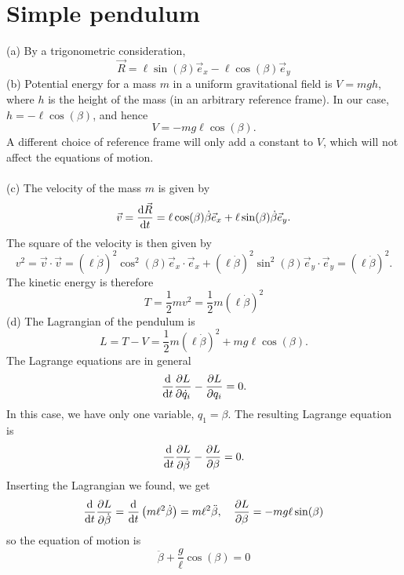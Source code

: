 \documentclass{article}
\begin{document}
    \section{Simple pendulum}
        (a) By a trigonometric consideration,
        \begin{equation*}
            \vec R = \ell \sin(\beta) \vec e_x - \ell \cos(\beta) \vec e_y
        \end{equation*}
        (b) Potential energy for a mass $m$ in a uniform gravitational field is $V = mgh$, where $h$ is the height of the mass (in an arbitrary reference frame). In our case, $h = - \ell \cos(\beta)$, and hence
        \begin{equation*}
            V = - m g \ell \cos(\beta).
        \end{equation*}
        A different choice of reference frame will only add a constant to $V$, which will not affect the equations of motion. \\ \\
        (c) The velocity of the mass $m$ is given by
        \begin{equation*}
            \vec v = \dv{\vec R}{t} = \ell \cos(\beta) \dot \beta \vec e_x + \ell \sin(\beta) \dot \beta \vec e_y.
        \end{equation*}
        The square of the velocity is then given by
        \begin{equation*}
            v^2 = \vec v \cdot \vec v = (\ell \dot \beta)^2 \cos^2(\beta) \vec e_x \cdot \vec e_x + (\ell \dot \beta)^2 \sin^2(\beta) \vec e_y \cdot \vec e_y  = (\ell \dot \beta)^2.
        \end{equation*}
        The kinetic energy is therefore 
        \begin{equation*}
            T = \frac{1}{2} m v^2 = \frac{1}{2}m (\ell \dot \beta)^2  
        \end{equation*}
        (d) The Lagrangian of the pendulum is 
        \begin{equation*}
            L = T - V = \frac{1}{2}m (\ell \dot \beta)^2  + m g \ell \cos(\beta).
        \end{equation*}
        The Lagrange equations are in general
        \begin{equation*}
            \dv{t} \pdv{L}{\dot q_i} - \pdv{L}{q_i} = 0.
        \end{equation*}
        In this case, we have only one variable, $q_1 = \beta$. The resulting Lagrange equation is 
        \begin{equation*}
            \dv{t} \pdv{L}{\dot \beta} - \pdv{L}{\beta} = 0.
        \end{equation*}
        Inserting the Lagrangian we found, we get
        \begin{align*}
            \dv{t}\pdv{L}{\dot \beta} 
            = \dv{t} \left( m \ell^2 \dot \beta \right) 
            = m \ell^2 \ddot \beta, 
            \quad \pdv{L}{\beta} = - m g \ell \sin(\beta)    
        \end{align*}
        so the equation of motion is
        \begin{equation*}
            \ddot \beta + \frac{g}{\ell} \cos(\beta) = 0
        \end{equation*}
\end{document}
